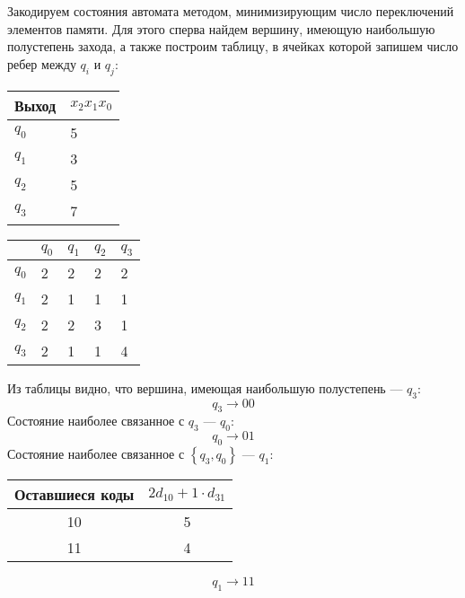 Закодируем состояния автомата методом, минимизирующим число переключений элементов
памяти. Для этого сперва найдем вершину, имеющую наибольшую полустепень
захода, а также построим таблицу, в ячейках которой запишем число ребер между
$q_i$ и $q_j$:
\begin{table}[H]
\centering
\begin{tabular}{|M|M|}
    \hline
    Выход & $x_2x_1x_0$ \\
    \hline
    $q_0$ & 5 \\
    \hline
    $q_1$ & 3 \\
    \hline
    $q_2$ & 5 \\
    \hline
    $q_3$ & 7 \\
    \hline
\end{tabular}
\hfill
\begin{tabular}{|M|M|M|M|M|}
    \hline
          & $q_0$ & $q_1$ & $q_2$ & $q_3$ \\
    \hline
    $q_0$ &   2   &   2   &   2   &   2   \\
    \hline
    $q_1$ &   2   &   1   &   1   &   1   \\
    \hline
    $q_2$ &   2   &   2   &   3   &   1   \\
    \hline
    $q_3$ &   2   &   1   &   1   &   4   \\
    \hline
\end{tabular}
\end{table}

Из таблицы видно, что вершина, имеющая наибольшую полустепень --- $q_3$:
\[
    q_3 \to 00
\]
Состояние наиболее связанное с $q_3$ --- $q_0$:
\[
    q_0 \to 01
\]
Состояние наиболее связанное с $\left\{ q_3, q_0\right\}$ --- $q_1$:

\vspace{-1cm}%
\begin{minipage}[t]{0.58\textwidth}
    \begin{table}[H]
        \centering
        \begin{tabularx}{\textwidth}{|C|C|}
            \hline
            Оставшиеся коды & $2d_{10} + 1\cdot d_{31}$ \\
             & 5 \\
             & 4 \\
            \hline
        \end{tabularx}
    \end{table}
\end{minipage}
\begin{minipage}[t]{0.38\textwidth}
    \vspace{1cm}
    \[
        q_1 \to 11
    \]
\end{minipage}

